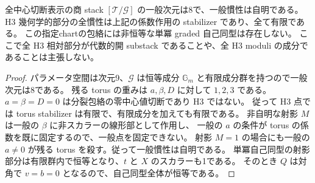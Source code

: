 \begin{corollary}
\label{cor:integrated-arrows-dimension}
全中心切断表示の商 stack $[\mathcal T/\mathcal G]$ の一般次元は8で、一般慣性は自明である。
H3 幾何学的部分の全慣性は上記の係数作用の stabilizer であり、全て有限である。
この指定chartの包絡には非恒等な単冪 graded 自己同型は存在しない。
ここで全 H3 相対部分が代数的開 substack であることや、全 H3 moduli の成分であることは主張しない。
\end{corollary}
\begin{proof}
パラメータ空間は次元9、$\mathcal G$ は恒等成分 $\mathbb G_m$ と有限成分群を持つので一般次元は8である。
残る torus の重みは $a,\beta,D$ に対して $1,2,3$ である。
$a=\beta=D=0$ は分裂包絡の零中心値切断であり H3 ではない。
従って H3 点では torus stabilizer は有限で、有限成分を加えても有限である。
非自明な射影 $M$ は一般の $\beta$ に非スカラーの線形部として作用し、
一般の $a$ の条件が torus の係数を既に固定するので、一般点を固定できない。
射影 $M=1$ の場合にも一般の $a\ne0$ が残る torus を殺す。従って一般慣性は自明である。
単冪自己同型の射影部分は有限群内で恒等となり、$t$ と $X$ のスカラーも1である。
そのとき $Q$ は対角で $v=b=0$ となるので、自己同型全体が恒等である。
\end{proof}
